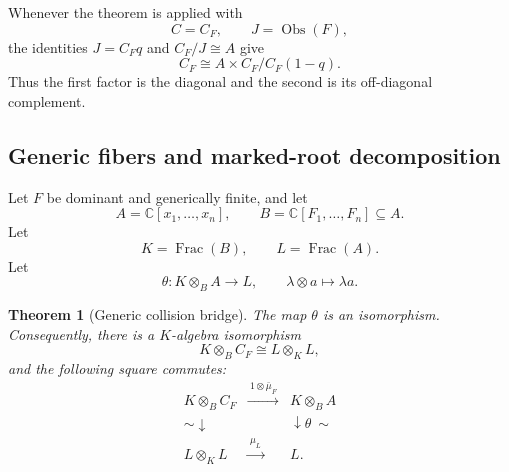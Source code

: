 \documentclass[11pt]{article}
\newtheorem{theorem}{Theorem}[section]
\theoremstyle{remark}
\theoremstyle{definition}
\DeclareMathOperator{\Frac}{Frac}
\newcommand{\C}{\mathbb C}
\newcommand{\Obs}{\operatorname{Obs}}
\begin{document}
Whenever the theorem is applied with
\[
  C=C_F,
  \qquad
  J=\Obs(F),
\]
the identities \(J=C_Fq\) and \(C_F/J\cong A\) give
\[
  C_F
  \cong
  A
  \times
  C_F/C_F(1-q).
\]
Thus the first factor is the diagonal and the second is its
off-diagonal complement.

\subsection{Generic fibers and marked-root decomposition}
\label{sec:generic-galois-bridge}

Let \(F\) be dominant and generically finite, and let
\[
  A=\C[x_1,\dots,x_n],
  \qquad
  B=\C[F_1,\dots,F_n]\subseteq A.
\]
Let
\[
  K=\Frac(B),
  \qquad
  L=\Frac(A).
\]
Let
\[
  \theta\colon K\otimes_BA\longrightarrow L,
  \qquad
  \lambda\otimes a\longmapsto\lambda a.
\]

\begin{theorem}[Generic collision bridge]
\label{thm:generic-collision-base-change}
The map \(\theta\) is an isomorphism.  Consequently, there is a
\(K\)-algebra isomorphism
\[
  K\otimes_BC_F
  \cong
  L\otimes_KL,
\]
and the following square commutes:
\[
  \begin{array}{ccc}
    K\otimes_BC_F
      &\xrightarrow{\ 1\otimes\bar\mu_F\ }&
    K\otimes_BA\\
    {\scriptstyle\sim}\downarrow
      &&\downarrow{\scriptstyle\theta\ \sim}\\
    L\otimes_KL
      &\xrightarrow{\ \mu_L\ }&
    L.
  \end{array}
\]
\end{theorem}
\end{document}
